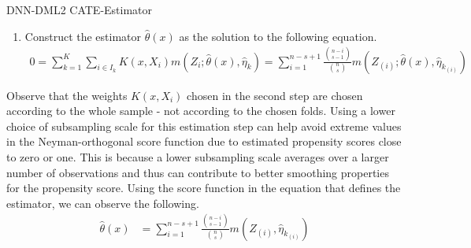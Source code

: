 \begin{boxD}
\begin{dfn}{DNN-DML2 CATE-Estimator}
\begin{enumerate}
			\item Construct the estimator $\hat{\theta}\left(x\right)$
			      as the solution to the following equation.
			      \begin{equation}
				      \begin{aligned}
					      0 = \sum_{k = 1}^{K} \sum_{i \in I_k} K(x, X_{i}) m\left(Z_{i}; \hat{\theta}\left(x\right), \hat{\eta}_{k}\right)
					      = \sum_{i = 1}^{n - s + 1} \frac{\binom{n-i}{s-1}}{\binom{n}{s}} m\left(Z_{(i)}; \hat{\theta}\left(x\right),\hat{\eta}_{k_{(i)}}\right)
				      \end{aligned}
			      \end{equation}
		\end{enumerate}
	\end{dfn}
\end{boxD}
Observe that the weights $K(x, X_{i})$ chosen in the second step are chosen according to the whole sample - not according to the chosen folds.
Using a lower choice of subsampling scale for this estimation step can help avoid extreme values in the Neyman-orthogonal score function due to estimated propensity scores close to zero or one.
This is because a lower subsampling scale averages over a larger number of observations and thus can contribute to better smoothing properties for the propensity score.
Using the score function in the equation that defines the estimator, we can observe the following.
\begin{equation}
	\begin{aligned}
		\hat{\theta}\left(x\right) 
        & = \sum_{i = 1}^{n - s + 1} \frac{\binom{n-i}{s-1}}{\binom{n}{s}} m(Z_{(i)}, \hat{\eta}_{k_{(i)}})
	\end{aligned}
\end{equation}

